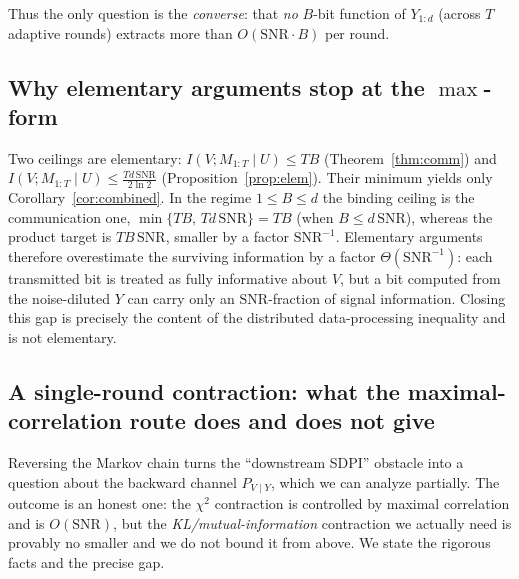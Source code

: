 \documentclass[11pt]{article}
\theoremstyle{definition}
\begin{document}
\noindent Thus the only question is the \emph{converse}: that \emph{no} $B$-bit function of
$Y_{1:d}$ (across $T$ adaptive rounds) extracts more than $O(\mathrm{SNR}\cdot B)$ per round.

\subsection{Why elementary arguments stop at the $\max$-form}\label{app:d:3}

Two ceilings are elementary: $I(V;M_{1:T}\mid U)\le TB$ (Theorem~\ref{thm:comm}) and
$I(V;M_{1:T}\mid U)\le\tfrac{Td\,\mathrm{SNR}}{2\ln2}$ (Proposition~\ref{prop:elem}). Their minimum yields only
Corollary~\ref{cor:combined}. In the regime $1\le B\le d$ the binding ceiling is the communication one,
$\min\{TB,\,Td\,\mathrm{SNR}\}=TB$ (when $B\le d\,\mathrm{SNR}$), whereas the product target is
$TB\,\mathrm{SNR}$, smaller by a factor $\mathrm{SNR}^{-1}$. Elementary arguments therefore overestimate
the surviving information by a factor $\Theta(\mathrm{SNR}^{-1})$: each transmitted bit is treated as
fully informative about $V$, but a bit computed from the noise-diluted $Y$ can carry only an
$\mathrm{SNR}$-fraction of signal information. Closing this gap is precisely the content of the
distributed data-processing inequality and is not elementary.

\subsection{A single-round contraction: what the maximal-correlation route does and does not give}\label{app:d:4}

Reversing the Markov chain turns the ``downstream SDPI'' obstacle into a question about the backward
channel $P_{V\mid Y}$, which we can analyze partially. The outcome is an honest one: the
\emph{$\chi^2$} contraction is controlled by maximal correlation and is $O(\mathrm{SNR})$, but the
\emph{KL/mutual-information} contraction we actually need is provably no smaller and we do not bound it
from above. We state the rigorous facts and the precise gap.
\end{document}
